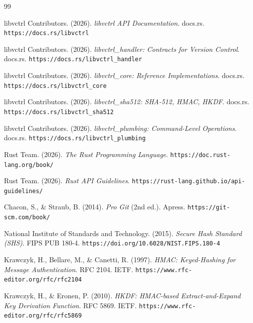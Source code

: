 \documentclass[11pt,a4paper]{article}
\begin{document}
\begin{thebibliography}{99}

	libvctrl Contributors. (2026).
	\textit{libvctrl API Documentation}.
	docs.rs.
	\texttt{https://docs.rs/libvctrl}

	libvctrl Contributors. (2026).
	\textit{libvctrl\_handler: Contracts for Version Control}.
	docs.rs.
	\texttt{https://docs.rs/libvctrl\_handler}

	libvctrl Contributors. (2026).
	\textit{libvctrl\_core: Reference Implementations}.
	docs.rs.
	\texttt{https://docs.rs/libvctrl\_core}

	libvctrl Contributors. (2026).
	\textit{libvctrl\_sha512: SHA-512, HMAC, HKDF}.
	docs.rs.
	\texttt{https://docs.rs/libvctrl\_sha512}

	libvctrl Contributors. (2026).
	\textit{libvctrl\_plumbing: Command-Level Operations}.
	docs.rs.
	\texttt{https://docs.rs/libvctrl\_plumbing}

	Rust Team. (2026).
	\textit{The Rust Programming Language}.
	\texttt{https://doc.rust-lang.org/book/}

	Rust Team. (2026).
	\textit{Rust API Guidelines}.
	\texttt{https://rust-lang.github.io/api-guidelines/}

	Chacon, S., \& Straub, B. (2014).
	\textit{Pro Git} (2nd ed.).
	Apress.
	\texttt{https://git-scm.com/book/}

	National Institute of Standards and Technology. (2015).
	\textit{Secure Hash Standard (SHS)}.
	FIPS PUB 180-4.
	\texttt{https://doi.org/10.6028/NIST.FIPS.180-4}

	Krawczyk, H., Bellare, M., \& Canetti, R. (1997).
	\textit{HMAC: Keyed-Hashing for Message Authentication}.
	RFC 2104.
	IETF.
	\texttt{https://www.rfc-editor.org/rfc/rfc2104}

	Krawczyk, H., \& Eronen, P. (2010).
	\textit{HKDF: HMAC-based Extract-and-Expand Key Derivation Function}.
	RFC 5869.
	IETF.
	\texttt{https://www.rfc-editor.org/rfc/rfc5869}

\end{thebibliography}
\end{document}
